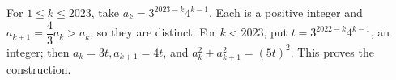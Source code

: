 For $1\le k\le2023$, take $a_k=3^{2023-k}4^{k-1}$. Each is a positive integer and $a_{k+1}=\dfrac{4}{3}a_k>a_k$, so they are distinct. For $k<2023$, put $t=3^{2022-k}4^{k-1}$, an integer; then $a_k=3t,a_{k+1}=4t$, and $a_k^2+a_{k+1}^2=(5t)^2$. This proves the construction.
